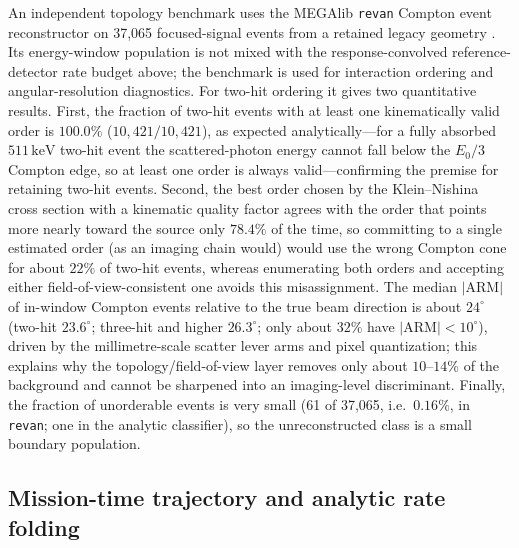 \documentclass[11pt]{article}
\newcommand{\keV}{\ensuremath{\,\mathrm{keV}}}
\begin{document}
An independent topology benchmark uses the MEGAlib \texttt{revan} Compton event
reconstructor on 37,065 focused-signal events from a retained legacy geometry
\cite{Zoglauer2006}. Its energy-window population is not mixed with the
response-convolved reference-detector rate budget above; the benchmark is used
for interaction ordering and angular-resolution diagnostics. For two-hit
ordering it gives two quantitative results. First, the fraction of two-hit
events with at least one kinematically valid order is $100.0\%$
($10{,}421/10{,}421$), as expected analytically---for a fully absorbed
$511\keV$ two-hit event the scattered-photon energy cannot fall below the
$E_0/3$ Compton edge, so at least one order is always valid---confirming the
premise for retaining two-hit events. Second, the best order chosen by the
Klein--Nishina cross section with a kinematic quality factor agrees with the
order that points more nearly toward the source only $78.4\%$ of the time, so
committing to a single estimated order (as an imaging chain would) would use the
wrong Compton cone for about $22\%$ of two-hit events, whereas enumerating both
orders and accepting either field-of-view-consistent one avoids this
misassignment. The median $|\mathrm{ARM}|$ of in-window Compton events relative
to the true beam direction is about $24^\circ$ (two-hit $23.6^\circ$; three-hit
and higher $26.3^\circ$; only about $32\%$ have $|\mathrm{ARM}|<10^\circ$),
driven by the millimetre-scale scatter lever arms and pixel quantization; this
explains why the topology/field-of-view layer removes only about $10$--$14\%$ of
the background and cannot be sharpened into an imaging-level discriminant.
Finally, the fraction of unorderable events is very small (61 of 37,065, i.e.\
$0.16\%$, in \texttt{revan}; one in the analytic classifier), so the
unreconstructed class is a small boundary population.

\subsection{Mission-time trajectory and analytic rate folding}
\label{sec:mission_time_fold}
\end{document}
